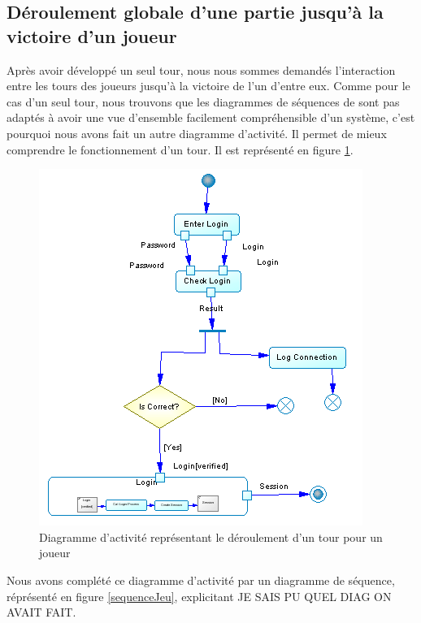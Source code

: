 \subsection{Déroulement globale d'une partie jusqu'à la victoire d'un joueur}
Après avoir développé un seul tour, nous nous sommes demandés l'interaction entre les tours des joueurs jusqu'à la victoire de l'un d'entre eux. Comme pour le cas d'un seul tour, nous trouvons que les diagrammes de séquences de sont pas adaptés à avoir une vue d'ensemble facilement compréhensible d'un système, c'est pourquoi nous avons fait un autre diagramme d'activité. Il permet de mieux comprendre le fonctionnement d'un tour. Il est représenté en figure \ref{activiteJeu}.

\begin{figure}[!h] 
\centerline{\includegraphics[scale=0.60]{img/activite_jeu_ex.png}}
   \caption{\label{étiquette} Diagramme d'activité représentant le déroulement d'un tour pour un joueur}
\label{activiteJeu}
\end{figure}

Nous avons complété ce diagramme d'activité par un diagramme de séquence, réprésenté en figure \ref{sequenceJeu}, explicitant JE SAIS PU QUEL DIAG ON AVAIT FAIT.

